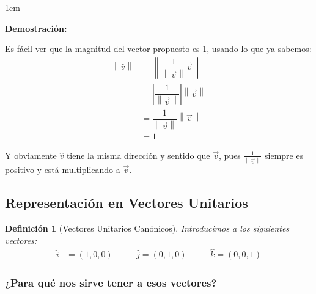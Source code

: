 \documentclass[12pt, fleqn]{report}                             %
\newenvironment{SmallIndentation}[1][0.75em]                    %
        {\begin{adjustwidth}{#1}{}\begin{footnotesize}}             %
        {\end{footnotesize}\end{adjustwidth}}                       %
\DeclareMathOperator \MegaSpace {\quad \quad}                   %
\newtheorem{Definition}{Definición}[section]                    %
\theoremstyle{break}                                            %
\newcommand{\abs}[1]{\left\lvert #1 \right\lvert}               %
\newcommand{\Abs}[1]{\left\lVert #1 \right\lVert}               %
\begin{document}
                \begin{SmallIndentation}[1em]
                    \textbf{Demostración:}

                    Es fácil ver que la magnitud del vector propuesto es 1, usando lo que ya sabemos:
                    \begin{align*}
                        \Abs{\hat{v}} 
                            &= \Abs{\dfrac{1}{\Abs{\vec{v}}} \vec{v}}               \\
                            &= \abs{\dfrac{1}{\Abs{\vec{v}}}} \Abs{\vec{v}}         \\
                            &= \dfrac{1}{\Abs{\vec{v}}} \Abs{\vec{v}}               \\
                            &= 1
                    \end{align*}

                    Y obviamente $\hat{v}$ tiene la misma dirección y sentido que $\vec{v}$,
                    pues $\frac{1}{\Abs{\vec{v}}}$ siempre es positivo y está multiplicando a $\vec{v}$.

                \end{SmallIndentation}
            
            \clearpage
            \subsection{Representación en Vectores Unitarios}
        
                \begin{Definition}[Vectores Unitarios Canónicos]
                    
                    Introducimos a los siguientes vectores:
                    \begin{align}
                        \hat{i} &= (1, 0, 0) \MegaSpace \hat{j} = (0, 1, 0) \MegaSpace \hat{k} = (0, 0, 1)
                    \end{align}

                \end{Definition}
            
                \subsubsection{¿Para qué nos sirve tener a esos vectores?}
\end{document}
